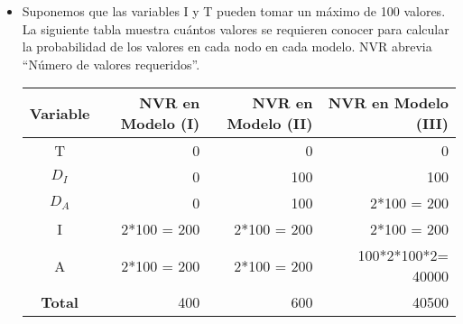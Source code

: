\documentclass[letterpaper,11pt]{article}
\begin{document}
\begin{itemize}
\begin{multicols}{2}
\begin{center}
    Distribución conjunta de la red: \[P(T)P(D_A|T,D_I)P(D_I|T)P(I|T,D_I),P(A|T,D_A,D_I,I)\]
    \vfill\null
    \columnbreak
\end{center}
En el modelo (III):
    \begin{itemize}[$\bullet$]
        \item  E.g., ahora se representa que el hecho de que la alarma sea defectuosa depende directamente de que el
            indicador lo sea. 
        \item Se eliminan aún más independencias condicionales; e.g., en los modelos (I) y (II) se cumple que $D_I|\Perp
            D_A|T$, sin embargo esto no se cumple en el Modelo (III) pues se tiene explícita la dependencia de 
            $D_A$ con respecto a $D_I$.
    \end{itemize}
\end{multicols}
    \item Suponemos que las variables I y T pueden tomar un máximo de 100 valores. La siguiente tabla muestra
        cuántos valores se requieren conocer para calcular la probabilidad de los valores en cada nodo en cada modelo.
        NVR abrevia ``Número de valores requeridos''.

        \begin{center}
        \begin{tabular}{|c|r|r|r|}%
            \hline
            Variable & NVR en Modelo (I) & NVR en Modelo (II) & NVR
            en Modelo (III) \\ 
            \hline
            T & 0 & 0 & 0 \\
            \hline
            $D_I$ & 0 & 100 & 100\\
            \hline
            $D_A$ & 0 & 100& 2*100 = 200 \\
            \hline
            I & 2*100 = 200 & 2*100 = 200 & 2*100 = 200\\
            \hline
            A & 2*100 = 200 & 2*100 = 200 & 100*2*100*2= 40000\\
            \hline
            \textbf{Total}& 400 &  600 & 40500 \\
            \hline
        \end{tabular}
    \end{center}


\end{itemize}
\end{document}
